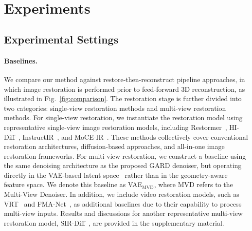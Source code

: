 
\section{Experiments}
\label{sec:exp}

\subsection{Experimental Settings}
\label{sec:exp_setup}

\paragraph{Baselines.}
We compare our method against restore-then-reconstruct pipeline approaches, in which image restoration is performed prior to feed-forward 3D reconstruction, as illustrated in Fig.~\ref{fig:comparison}. The restoration stage is further divided into two categories: single-view restoration methods and multi-view restoration methods. For single-view restoration, we instantiate the restoration model using representative single-view image restoration models, including Restormer~\cite{zamir2022restormer}, HI-Diff~\cite{chen2023hierarchical}, InstructIR~\cite{conde2024high}, and MoCE-IR~\cite{zamfir2024complexityexperts}. These methods collectively cover conventional restoration architectures, diffusion-based approaches, and all-in-one image restoration frameworks. For multi-view restoration, we construct a baseline using the same denoising architecture as the proposed GARD denoiser, but operating directly in the VAE-based latent space~\cite{kingma2013auto} rather than in the geometry-aware feature space. We denote this baseline as VAE$_\text{MVD}$, where MVD refers to the Multi-View Denoiser. In addition, we include video restoration models, such as VRT~\cite{liang2024vrt} and FMA-Net~\cite{Youk_2024_CVPR}, as additional baselines due to their capability to process multi-view inputs. Results and discussions for another representative multi-view restoration model, SIR-Diff~\cite{mao2025sir}, are provided in the supplementary material.




